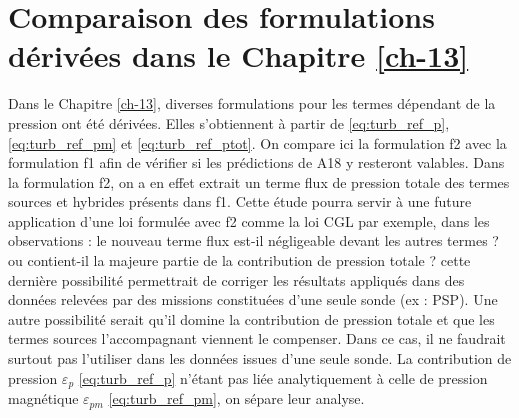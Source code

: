 \section{Comparaison des formulations dérivées dans le Chapitre \ref{ch-13}}
\label{an:compa_form}
Dans le Chapitre \ref{ch-13}, diverses formulations pour les termes dépendant de la pression ont été dérivées. Elles s'obtiennent à partir de \eqref{eq:turb_ref_p}, \eqref{eq:turb_ref_pm} et  \eqref{eq:turb_ref_ptot}. On compare ici la formulation f2 avec la formulation f1 afin de vérifier si les prédictions de A18 y resteront valables. Dans la formulation f2, on a en effet extrait un terme flux de pression totale des termes sources et hybrides présents dans f1. Cette étude pourra servir à une future application d'une loi formulée avec f2 comme la loi CGL par exemple, dans les observations : le nouveau terme flux est-il négligeable devant les autres termes ? ou contient-il la majeure partie de la contribution de pression totale ? cette dernière possibilité permettrait de corriger les résultats appliqués dans des données relevées par des missions constituées d'une seule sonde (ex : \ac{PSP}). Une autre possibilité serait qu'il domine la contribution de pression totale et que les termes sources l'accompagnant viennent le compenser. Dans ce cas, il ne faudrait surtout pas l'utiliser dans les données issues d'une seule sonde. La contribution de pression $\varepsilon_{p}$ \eqref{eq:turb_ref_p} n'étant pas liée analytiquement à celle de pression magnétique $\varepsilon_{pm}$ \eqref{eq:turb_ref_pm}, on sépare leur analyse.

